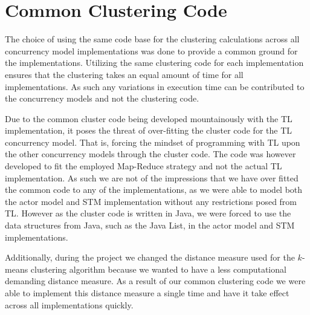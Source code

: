 \section{Common Clustering Code}
The choice of using the same code base for the clustering calculations across all concurrency model implementations was done to provide a common ground for the implementations. Utilizing the same clustering code for each implementation ensures that the clustering takes an equal amount of time for all implementations. As such any variations in execution time can be contributed to the concurrency models and not the clustering code. 


Due to the common cluster code being developed mountainously with the \ac{TL} implementation, it poses the threat of over-fitting the cluster code for the \ac{TL} concurrency model. That is, forcing the mindset of programming with \ac{TL} upon the other concurrency models through the cluster code. The code was however developed to fit the employed Map-Reduce strategy and not the actual \ac{TL} implementation. As such we are not of the impressions that we have over fitted the common code to any of the implementations, as we were able to model both the actor model and \ac{STM} implementation without any restrictions posed from \ac{TL}. However as the cluster code is written in Java, we were forced to use the data structures from Java, such as the Java List, in the actor model and \ac{STM} implementations.

Additionally, during the project we changed the distance measure used for the $k$-means clustering algorithm because we wanted to have a less computational demanding distance measure. As a result of our common clustering code we were able to implement this distance measure a single time and have it take effect across all implementations quickly.


\worksheetend